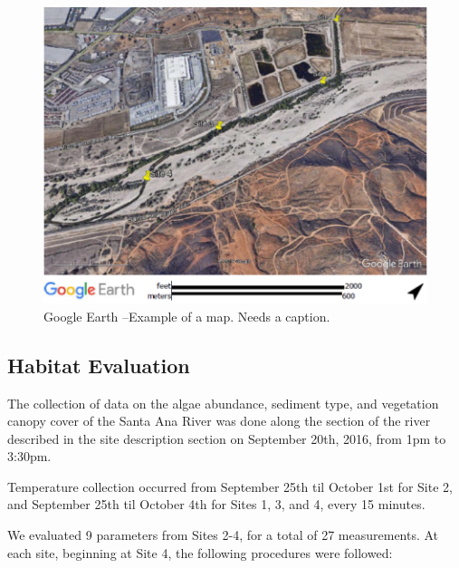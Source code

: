 \documentclass{article}\usepackage[]{graphicx}\usepackage[]{color}
\begin{document}
\begin{figure}[!ht]
\includegraphics[width=1.00\textwidth]{Figures/SiteMap}
\caption{Google Earth --Example of a map. Needs a caption.}
\label{SAR_Image}
\end{figure}

\subsection{Habitat Evaluation}

The collection of data on the algae abundance, sediment type, and vegetation canopy cover of the Santa Ana River was done along the section of the river described in the site description section on September 20th, 2016, from 1pm to 3:30pm.

Temperature collection occurred from September 25th til October 1st for Site 2, and September 25th til October 4th for Sites 1, 3, and 4, every 15 minutes.

We evaluated 9 parameters from Sites 2-4, for a total of 27 measurements. At each site, beginning at Site 4, the following procedures were followed: 
\end{document}

